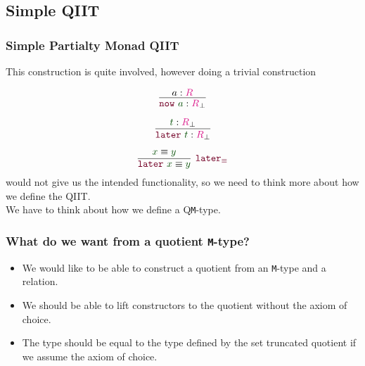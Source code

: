 \documentclass[xelatex,mathserif,serif,notheorems]{beamer} %
\theoremstyle{plain} %
\theoremstyle{definition}
\theoremstyle{remark}
\newcommand*{\term}[1]{\textcolor{green!30!black}{#1}} %
\newcommand*{\type}[1]{\textcolor{magenta!90!black}{#1}}
\newcommand*{\constructor}[1]{\textcolor{purple!60!black}{\ensuremath{\mathtt{#1}}}}
\begin{document}
\subsection{Simple QIIT}
\begin{frame}
  \frametitle{Simple Partialty Monad QIIT}
  This construction is quite involved, however doing a trivial construction\\[3mm]
  \strut\hfill
  \begin{minipage}{0.3\linewidth}
    \begin{equation}
      \vcenter{\infer{\constructor{now}~\term{a} : \type{R}_\bot}{a : \type{R}}}
    \end{equation}
  \end{minipage}
  \hfill
  \begin{minipage}{0.4\linewidth}
    \begin{equation}
      \vcenter{\infer{\constructor{later}~\term{t} : \type{R}_\bot}{\term{t} : \type{R}_\bot}}
    \end{equation}
  \end{minipage}
  \hfill\strut
  \begin{equation}
    \vcenter{\infer[\constructor{later_{\equiv}}]{\constructor{later}~\term{x} \equiv \term{y}}{\term{x} \equiv \term{y}}}
  \end{equation}
  would not give us the intended functionality, so we need to think more about how we define the QIIT.
  \\[3mm]
  We have to think about how we define a Q\texttt{M}-type.
\end{frame}

\begin{frame}
  \frametitle{What do we want from a quotient \texttt{M}-type?}
  \begin{itemize}
  \item We would like to be able to construct a quotient from an \texttt{M}-type and a relation.
  \item We should be able to lift constructors to the quotient without the axiom of choice.
  \item The type should be equal to the type defined by the set truncated quotient if we assume the axiom of choice.
  \end{itemize}
\end{frame}
\end{document}
